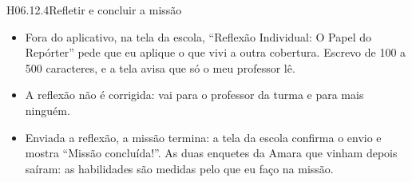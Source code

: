\begin{historia}{H06.12.4}{Refletir e concluir a missão}{\parcial}
\aceite
\begin{itemize}
  \item Fora do aplicativo, na tela da escola, \enquote{Reflexão Individual: O
    Papel do Repórter} pede que eu aplique o que vivi a outra cobertura. Escrevo
    de 100 a 500 caracteres, e a tela avisa que só o meu professor lê.
  \item A reflexão não é corrigida: vai para o professor da turma e para mais
    ninguém.
  \item Enviada a reflexão, a missão termina: a tela da escola confirma o envio
    e mostra \enquote{Missão concluída!}. As duas enquetes da Amara que vinham
    depois saíram: as habilidades são medidas pelo que eu faço na missão.
\end{itemize}
\end{historia}

